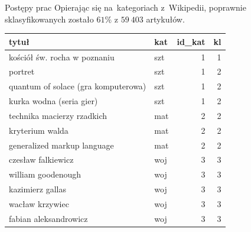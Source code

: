 \documentclass[11pt,pdftex,mathserif]{beamer}\usepackage[]{graphicx}\usepackage[]{color}
\theoremstyle{definition}
\begin{document}
% 


\begin{frame}{Postępy prac}
Opierając się na~kategoriach z~Wikipedii, poprawnie sklasyfikowanych zostało $61\%$ z $59\ 403$ artykułów.
\begin{tabular}{|l|l|r|r|}
  \hline
tytuł & kat & id\_kat & kl \\ 
  \hline
kościół św. rocha w poznaniu & szt & 1 & 1 \\ 
  portret & szt & 1 & 2 \\ 
  quantum of solace (gra komputerowa) & szt & 1 & 2 \\ 
  kurka wodna (seria gier) & szt & 1 & 2 \\ 
  technika macierzy rzadkich & mat & 2 & 2 \\ 
  kryterium walda & mat & 2 & 2 \\ 
  generalized markup language & mat & 2 & 2 \\ 
  czesław falkiewicz & woj & 3 & 3 \\ 
  william goodenough & woj & 3 & 3 \\ 
  kazimierz gallas & woj & 3 & 3 \\ 
  wacław krzywiec & woj & 3 & 3 \\ 
  fabian aleksandrowicz & woj & 3 & 3 \\ 
   \hline
\end{tabular}

% 
% 
\end{frame}
\end{document}

